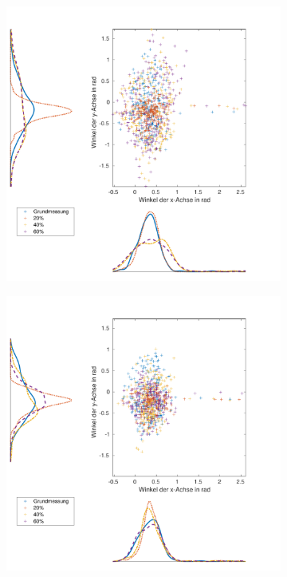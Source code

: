 \begin{figure}[tb]
	\centering
	\begin{adjustwidth}{-0.2\linewidth}{-0.2\linewidth}
		\hspace{45pt}
		\begin{subfigure}[c]{.45\linewidth}
			\centering
			\includegraphics[width=\linewidth]{Bilder/Winkel_Grund_20_40_60_ohneM.pdf}
			\vspace{5pt}
		\end{subfigure}
		\hspace{-20pt}
		\begin{subfigure}[c]{.45\linewidth}
			\centering
			\includegraphics[width=\linewidth]{Bilder/Winkel_Grund_20_40_60_mitM.pdf}

\end{subfigure}
\end{adjustwidth}
\end{figure}

